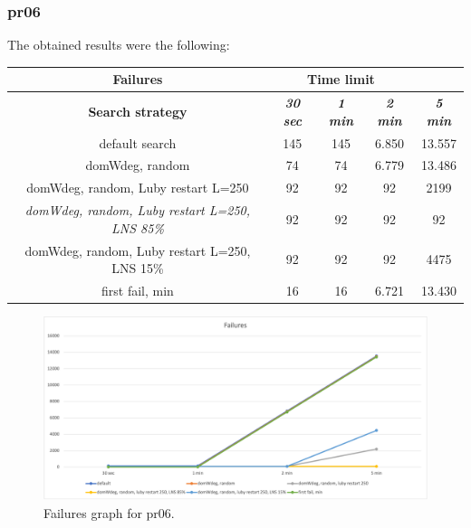 \subsubsection{pr06}
The obtained results were the following:
{
\renewcommand{\arraystretch}{2}
\begin{longtable}[h]{| c | c | c | c | c |}
    \hline
    \textbf{Failures} & \multicolumn{3}{c}{Time limit} & \\
    \hline
    \textbf{Search strategy} & \textbf{\textit{30 sec}} & \textbf{\textit{1 min}} & \textbf{\textit{2 min}} & \textbf{\textit{5 min}} \\
    \hline
    \endhead
    default search                                         & 145 &  145 &  6.850 &  13.557 \\
    \hline
    domWdeg, random                                        &  74 &   74 &  6.779 &  13.486 \\
    \hline
    domWdeg, random, Luby restart L=250                    &  92 &   92 &   92 &    2199 \\
    \hline
    \textit{domWdeg, random, Luby restart L=250, LNS 85\%} &  92 &   92 &   92 &      92 \\
    \hline
    domWdeg, random, Luby restart L=250, LNS 15\%          &  92 &   92 &   92 &    4475 \\
    \hline
    first fail, min                                        &  16 &   16 & 6.721 &   13.430 \\
    \hline
\end{longtable}
}
\begin{figure}[H]
    \centering
    \includegraphics[width=1.0\columnwidth]{../graphs/pr06-failures.png}
    \caption{Failures graph for pr06.}
\end{figure}

